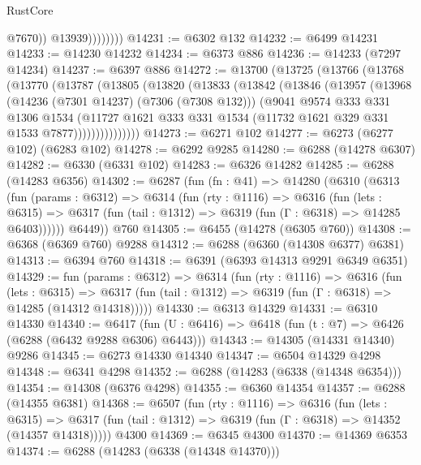 \begin{lexlean}{RustCore}
\begin{coremodule}
                        @7670))
                    @13939))))))))
@14231 := @6302 @132
@14232 := @6499 @14231
@14233 := @14230 @14232
@14234 := @6373 @886
@14236 := @14233 (@7297 @14234)
@14237 := @6397 @886
@14272 := @13700
    (@13725
      (@13766
        (@13768
          (@13770
            (@13787
              (@13805
                (@13820
                  (@13833
                    (@13842
                      (@13846
                        (@13957
                          (@13968
                            (@14236 (@7301 @14237) (@7306 (@7308 @132)))
                            (@9041
                              @9574
                              @333
                              @331
                              @1306
                              @1534
                              (@11727
                                @1621
                                @333
                                @331
                                @1534
                                (@11732 @1621 @329 @331 @1533 @7877)))))))))))))))
@14273 := @6271 @102
@14277 := @6273 (@6277 @102) (@6283 @102)
@14278 := @6292 @9285
@14280 := @6288 (@14278 @6307)
@14282 := @6330 (@6331 @102)
@14283 := @6326 @14282
@14285 := @6288 (@14283 @6356)
@14302 := @6287
    (fun (fn : @41) =>
    @14280
      (@6310
        (@6313
          (fun (params : @6312) =>
          @6314
            (fun (rty : @1116) =>
            @6316
              (fun (lets : @6315) =>
              @6317 (fun (tail : @1312) => @6319 (fun (Γ : @6318) => @14285 @6403))))))
        @6449))
    @760
@14305 := @6455 (@14278 (@6305 @760))
@14308 := @6368 (@6369 @760) @9288
@14312 := @6288 (@6360 (@14308 @6377) @6381)
@14313 := @6394 @760
@14318 := @6391 (@6393 @14313 @9291 @6349 @6351)
@14329 := fun (params : @6312) =>
  @6314
    (fun (rty : @1116) =>
    @6316
      (fun (lets : @6315) =>
      @6317 (fun (tail : @1312) => @6319 (fun (Γ : @6318) => @14285 (@14312 @14318)))))
@14330 := @6313 @14329
@14331 := @6310 @14330
@14340 := @6417 (fun (U : @6416) => @6418 (fun (t : @7) => @6426 (@6288 (@6432 @9288 @6306) @6443)))
@14343 := @14305 (@14331 @14340) @9286
@14345 := @6273 @14330 @14340
@14347 := @6504 @14329 @4298
@14348 := @6341 @4298
@14352 := @6288 (@14283 (@6338 (@14348 @6354)))
@14354 := @14308 (@6376 @4298)
@14355 := @6360 @14354
@14357 := @6288 (@14355 @6381)
@14368 := @6507
    (fun (rty : @1116) =>
    @6316
      (fun (lets : @6315) =>
      @6317 (fun (tail : @1312) => @6319 (fun (Γ : @6318) => @14352 (@14357 @14318)))))
    @4300
@14369 := @6345 @4300
@14370 := @14369 @6353
@14374 := @6288 (@14283 (@6338 (@14348 @14370)))

\end{coremodule}
\end{lexlean}
